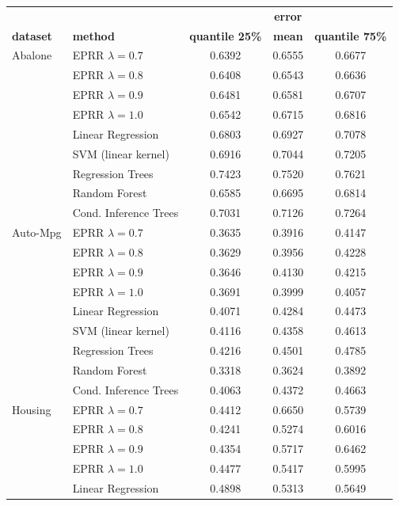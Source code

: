 \documentclass[review,preprint]{elsarticle}
\begin{document}
\begin{table}[t]
	\footnotesize
	\renewcommand{\arraystretch}{0.5}
	\begin{tabular}{ll|ccc}
		&&& \textbf{error} \\
		\textbf{dataset} & \textbf{method} & \textbf{quantile 25\%} & \textbf{mean} & \textbf{quantile 75\%} \\
		\hline
		Abalone	 & EPRR $\lambda = 0.7$ 	& 0.6392 & 0.6555 & 0.6677 \\
					 & EPRR $\lambda = 0.8$ 	& 0.6408 & 0.6543 & 0.6636 \\
					 & EPRR $\lambda = 0.9$ 	& 0.6481 & 0.6581 & 0.6707 \\
					 & EPRR $\lambda = 1.0$ 	& 0.6542 & 0.6715 & 0.6816 \\
					 & Linear Regression 	& 0.6803 & 0.6927 & 0.7078 \\
					 & SVM (linear kernel) 	& 0.6916 & 0.7044 & 0.7205 \\
					 & Regression Trees 	& 0.7423 & 0.7520 & 0.7621 \\
					 & Random Forest 	& 0.6585 & 0.6695 & 0.6814 \\
					 & Cond. Inference Trees 	& 0.7031 & 0.7126 & 0.7264 \\
		Auto-Mpg	 & EPRR $\lambda = 0.7$ 	& 0.3635 & 0.3916 & 0.4147 \\
					 & EPRR $\lambda = 0.8$ 	& 0.3629 & 0.3956 & 0.4228 \\
					 & EPRR $\lambda = 0.9$ 	& 0.3646 & 0.4130 & 0.4215 \\
					 & EPRR $\lambda = 1.0$ 	& 0.3691 & 0.3999 & 0.4057 \\
					 & Linear Regression 	& 0.4071 & 0.4284 & 0.4473 \\
					 & SVM (linear kernel) 	& 0.4116 & 0.4358 & 0.4613 \\
					 & Regression Trees 	& 0.4216 & 0.4501 & 0.4785 \\
					 & Random Forest 	& 0.3318 & 0.3624 & 0.3892 \\
					 & Cond. Inference Trees 	& 0.4063 & 0.4372 & 0.4663 \\
		Housing	 & EPRR $\lambda = 0.7$ 	& 0.4412 & 0.6650 & 0.5739 \\
					 & EPRR $\lambda = 0.8$ 	& 0.4241 & 0.5274 & 0.6016 \\
					 & EPRR $\lambda = 0.9$ 	& 0.4354 & 0.5717 & 0.6462 \\
					 & EPRR $\lambda = 1.0$ 	& 0.4477 & 0.5417 & 0.5995 \\
					 & Linear Regression 	& 0.4898 & 0.5313 & 0.5649 \\

\end{tabular}
\end{table}
\end{document}
